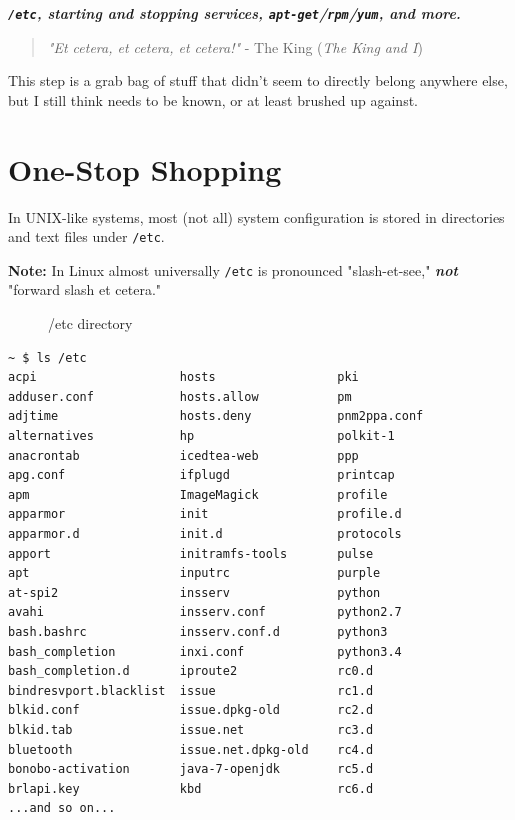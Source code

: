 \documentclass[10pt,]{book}
\numberwithin{figure}{chapter}
\DeclareRobustCommand{\drcap}[1]{\begin{figure}[H]\caption{#1}\end{figure}}
\begin{document}
\textbf{\emph{\texttt{/etc}, starting and stopping services,
\texttt{apt-get}/\texttt{rpm}/\texttt{yum}, and more.}}

\begin{quote}
\emph{"Et cetera, et cetera, et cetera!"} - The King (\emph{The King and
I})
\end{quote}

This step is a grab bag of stuff that didn't seem to directly belong
anywhere else, but I still think needs to be known, or at least brushed
up against.

\section*{One-Stop Shopping}\label{one-stop-shopping}

In UNIX-like systems, most (not all) system configuration is stored in
directories and text files under \texttt{/etc}.

\textbf{Note:} In Linux almost universally \texttt{/etc} is pronounced
"slash-et-see," \textbf{\emph{not}} "forward slash et cetera."

\drcap{/etc directory}

\begin{verbatim}
~ $ ls /etc
acpi                    hosts                 pki
adduser.conf            hosts.allow           pm
adjtime                 hosts.deny            pnm2ppa.conf
alternatives            hp                    polkit-1
anacrontab              icedtea-web           ppp
apg.conf                ifplugd               printcap
apm                     ImageMagick           profile
apparmor                init                  profile.d
apparmor.d              init.d                protocols
apport                  initramfs-tools       pulse
apt                     inputrc               purple
at-spi2                 insserv               python
avahi                   insserv.conf          python2.7
bash.bashrc             insserv.conf.d        python3
bash_completion         inxi.conf             python3.4
bash_completion.d       iproute2              rc0.d
bindresvport.blacklist  issue                 rc1.d
blkid.conf              issue.dpkg-old        rc2.d
blkid.tab               issue.net             rc3.d
bluetooth               issue.net.dpkg-old    rc4.d
bonobo-activation       java-7-openjdk        rc5.d
brlapi.key              kbd                   rc6.d
...and so on...
\end{verbatim}
\end{document}
